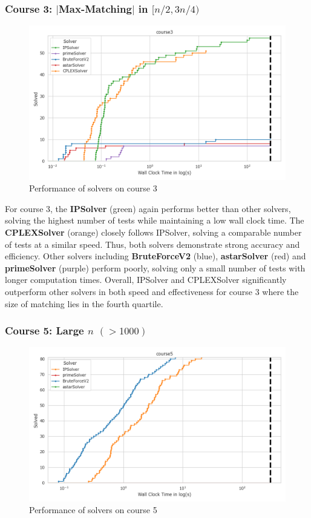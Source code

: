 \subsubsection*{Course 3: $\vert$Max-Matching$\vert$ in $[n/2,3n/4)$}

\begin{figure}[h!]
    \centering
    \includegraphics[width=\textwidth]{Graphs/course3.png}
    \caption{Performance of solvers on course 3}
\end{figure}

For course 3, the \textbf{IPSolver} (green) again performs better than other solvers, solving the highest number of tests while maintaining a low wall clock time. The \textbf{CPLEXSolver} (orange) closely follows IPSolver, solving a comparable number of tests at a similar speed. Thus, both solvers demonstrate strong accuracy and efficiency. Other solvers including \textbf{BruteForceV2} (blue), \textbf{astarSolver} (red) and \textbf{primeSolver} (purple) perform poorly, solving only a small number of tests with longer computation times. Overall, IPSolver and CPLEXSolver significantly outperform other solvers in both speed and effectiveness for course 3 where the size of matching lies in the fourth quartile.

\subsubsection*{Course 5: Large $n$ $(>1000)$}
\begin{figure}[h!]
    \centering
    \includegraphics[width=\textwidth]{Graphs/course5.png}
    \caption{Performance of solvers on course 5}
\end{figure}

